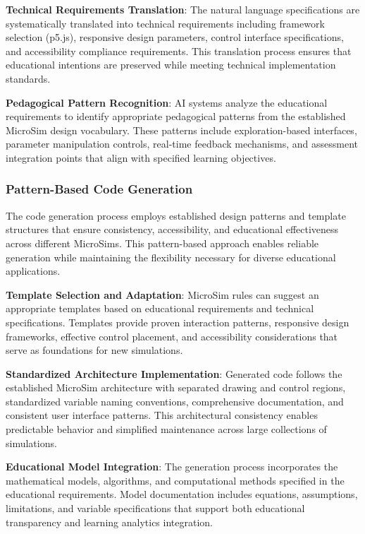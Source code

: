 \textbf{Technical Requirements Translation}: The natural language specifications are systematically translated into technical requirements including framework selection (p5.js), responsive design parameters, control interface specifications, and accessibility compliance requirements. This translation process ensures that educational intentions are preserved while meeting technical implementation standards.

\textbf{Pedagogical Pattern Recognition}: AI systems analyze the educational requirements to identify appropriate pedagogical patterns from the established MicroSim design vocabulary. These patterns include exploration-based interfaces, parameter manipulation controls, real-time feedback mechanisms, and assessment integration points that align with specified learning objectives.

\subsubsection{Pattern-Based Code Generation}

The code generation process employs established design patterns and template structures that ensure consistency, accessibility, and educational effectiveness across different MicroSims. This pattern-based approach enables reliable generation while maintaining the flexibility necessary for diverse educational applications.

\textbf{Template Selection and Adaptation}: MicroSim rules can suggest an appropriate templates based on educational requirements and technical specifications. Templates provide proven interaction patterns, responsive design frameworks, effective control placement, and accessibility considerations that serve as foundations for new simulations.

\textbf{Standardized Architecture Implementation}: Generated code follows the established MicroSim architecture with separated drawing and control regions, standardized variable naming conventions, comprehensive documentation, and consistent user interface patterns. This architectural consistency enables predictable behavior and simplified maintenance across large collections of simulations.

\textbf{Educational Model Integration}: The generation process incorporates the mathematical models, algorithms, and computational methods specified in the educational requirements. Model documentation includes equations, assumptions, limitations, and variable specifications that support both educational transparency and learning analytics integration.

